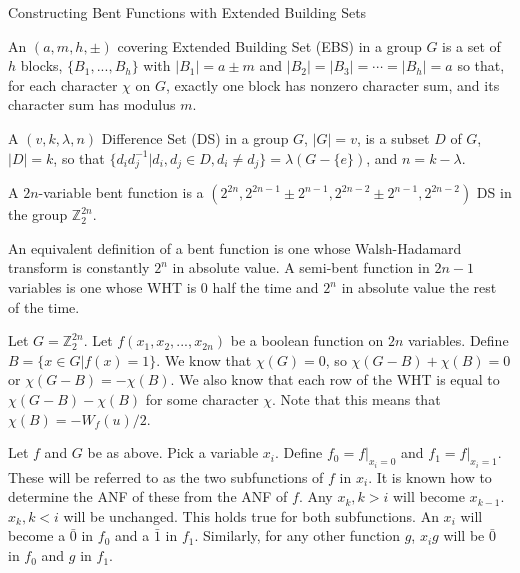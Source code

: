 \documentclass[12pt]{amsart}
\newcommand{\Z}{\mathbb{Z}}
\begin{document}
\begin{center}

\begin{LARGE}

Constructing Bent Functions with Extended Building Sets

\end{LARGE}

\end{center}

\bigskip \bigskip

An $(a,m,h,\pm)$ covering Extended Building Set (EBS) in a group $G$ is a set of $h$ blocks, $\{B_1,...,B_h\}$ with $|B_1| = a \pm m$ and $|B_2| = |B_3| = \cdots = |B_h| = a$ so that, for each character $\chi$ on $G$, exactly one block has nonzero character sum, and its character sum has modulus $m$.

\bigskip

A $(v,k,\lambda,n)$ Difference Set (DS) in a group $G$, $|G| = v$, is a subset $D$ of $G$, $|D| = k$, so that $\{d_id_j^{-1}|d_i,d_j \in D, d_i \neq d_j\} = \lambda(G - \{e\})$, and $n = k - \lambda$.

\bigskip

A $2n$-variable bent function is a $(2^{2n},2^{2n-1} \pm 2^{n-1},2^{2n-2} \pm 2^{n-1},2^{2n-2})$ DS in the group $\Z_2^{2n}$.

\bigskip

An equivalent definition of a bent function is one whose Walsh-Hadamard transform is constantly $2^{n}$ in absolute value.  A semi-bent function in $2n-1$ variables is one whose WHT is $0$ half the time and $2^n$ in absolute value the rest of the time.

\bigskip

Let $G = \Z_2^{2n}$.  Let $f(x_1,x_2,...,x_{2n})$ be a boolean function on $2n$ variables.  Define $B = \{x \in G | f(x) = 1\}$.  We know that $\chi(G) = 0$, so $\chi(G-B) + \chi(B) = 0$ or $\chi(G-B) = -\chi(B)$.  We also know that each row of the WHT is equal to $\chi(G-B) - \chi(B)$ for some character $\chi$.  Note that this means that $\chi(B) = -W_{f}(u)/2$.

\bigskip

Let $f$ and $G$ be as above.  Pick a variable $x_i$.  Define $f_0 = f|_{x_i=0}$ and $f_1 = f|_{x_i=1}$.  These will be referred to as the two subfunctions of $f$ in $x_i$.  It is known how to determine the ANF of these from the ANF of $f$.  Any $x_k,k > i$ will become $x_{k-1}$.  $x_k, k< i$ will be unchanged.  This holds true for both subfunctions.  An $x_i$ will become a $\bar{0}$ in $f_0$ and a $\bar{1}$ in $f_1$.  Similarly, for any other function $g$, $x_ig$ will be $\bar{0}$ in $f_0$ and $g$ in $f_1$.
\end{document}
